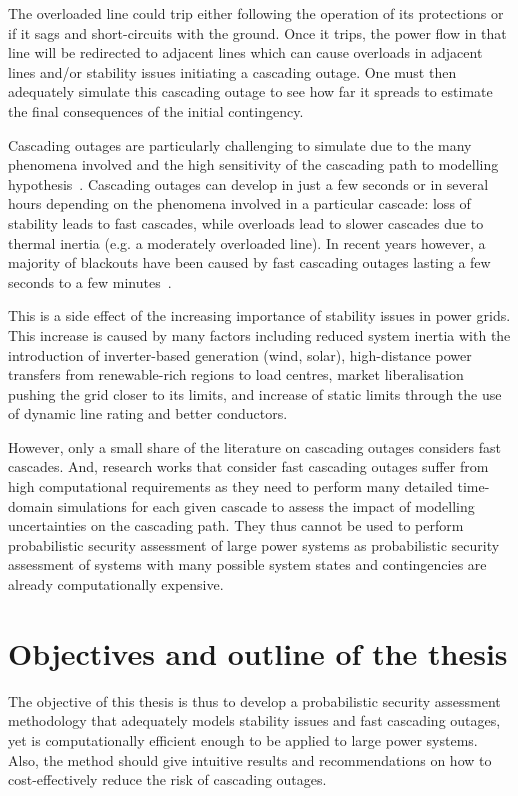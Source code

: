 The overloaded line could trip either following the operation of its protections or if it sags and short-circuits with the ground. Once it trips, the power flow in that line will be redirected to adjacent lines which can cause overloads in adjacent lines and/or stability issues initiating a cascading outage. One must then adequately simulate this cascading outage to see how far it spreads to estimate the final consequences of the initial contingency.

Cascading outages are particularly challenging to simulate due to the many phenomena involved and the high sensitivity of the cascading path to modelling hypothesis~\cite{CascadingMethodoAndChallenges}. Cascading outages can develop in just a few seconds or in several hours depending on the phenomena involved in a particular cascade: loss of stability leads to fast cascades, while overloads lead to slower cascades due to thermal inertia (e.g. a moderately overloaded line). In recent years however, a majority of blackouts have been caused by fast cascading outages lasting a few seconds to a few minutes~\cite{cascadeAcceleration}.

This is a side effect of the increasing importance of stability issues in power grids. This increase is caused by many factors including reduced system inertia with the introduction of inverter-based generation (wind, solar), high-distance power transfers from renewable-rich regions to load centres, market liberalisation pushing the grid closer to its limits, and increase of static limits through the use of dynamic line rating and better conductors.

However, only a small share of the literature on cascading outages considers fast cascades. And, research works that consider fast cascading outages suffer from high computational requirements as they need to perform many detailed time-domain simulations for each given cascade to assess the impact of modelling uncertainties on the cascading path. They thus cannot be used to perform probabilistic security assessment of large power systems as probabilistic security assessment of systems with many possible system states and contingencies are already computationally expensive.


\section{Objectives and outline of the thesis}

The objective of this thesis is thus to develop a probabilistic security assessment methodology that adequately models stability issues and fast cascading outages, yet is computationally efficient enough to be applied to large power systems. Also, the method should give intuitive results and recommendations on how to cost-effectively reduce the risk of cascading outages.


